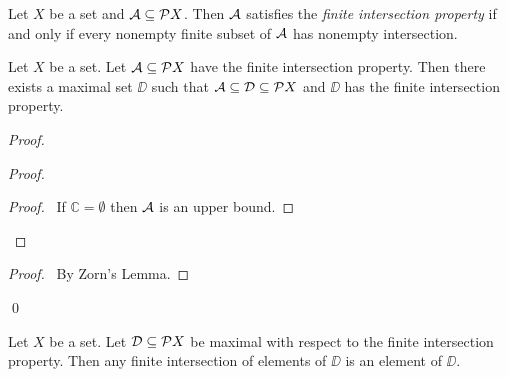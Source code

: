 \begin{definition}
    Let $X$ be a set and $\AA \subseteq \pow X$. Then $\AA$ satisfies the \emph{finite intersection property} if and only if every nonempty finite subset of $\AA$
    has nonempty intersection.
\end{definition}

\begin{lemma}
    \label{lemma:maximal_finite_intersection_property}
    Let $X$ be a set. Let $\AA \subseteq \pow X$ have the finite intersection property.
    Then there exists a maximal set $\DD$ such that $\AA \subseteq \DD \subseteq \pow X$
    and $\DD$ has the finite intersection property.
\end{lemma}

\begin{proof}
    \pf
    \begin{proof}
        \begin{proof}
            \pf\ If $\mathbb{C} = \emptyset$ then $\AA$ is an upper bound.
        \end{proof}
    \end{proof}
    \qedstep
    \begin{proof}
        \pf\ By Zorn's Lemma.
    \end{proof}
    \qed
\end{proof}

\begin{lemma}
    \label{lemma:finite_intersection_maximal}
    Let $X$ be a set. Let $\DD \subseteq \pow X$ be maximal with respect to the finite intersection property.
    Then any finite intersection of elements of $\DD$ is an element of $\DD$.
\end{lemma}

